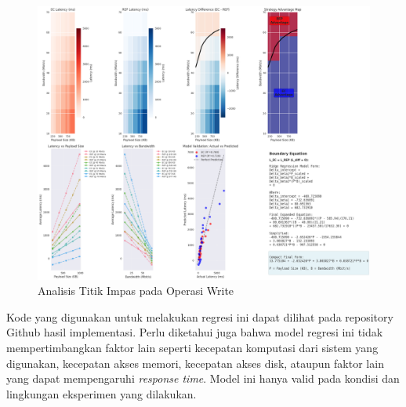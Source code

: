 \begin{enumerate}
	      \begin{figure}[ht]
		      \centering
		      \includegraphics[width=\textwidth]{resources/chapter-4/write_bigload_avgnet_boundary.png}

		      \caption{Analisis Titik Impas pada Operasi Write}
		      \label{fig:write-bigload-avgnet-boundary}
	      \end{figure}

	      Kode yang digunakan untuk melakukan regresi ini dapat dilihat pada repository Github hasil implementasi. Perlu diketahui juga bahwa model regresi ini tidak mempertimbangkan faktor lain seperti kecepatan komputasi dari sistem yang digunakan, kecepatan akses memori, kecepatan akses disk, ataupun faktor lain yang dapat mempengaruhi \textit{response time}. Model ini hanya valid pada kondisi dan lingkungan eksperimen yang dilakukan.

\end{enumerate}